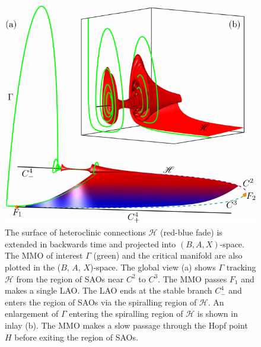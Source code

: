 \documentclass{ws-ijbc}
\begin{document}
\begin{figure}[H]
\centering
\includegraphics[]{./figures/MKMO_13.pdf}
\caption{The surface of heteroclinic connections $\mathscr{H}$ (red-blue fade) is extended in backwards time and projected into $(B,A,X)$-space.  The MMO of interest $\Gamma$ (green) and the critical manifold are also plotted in the ($B$, $A$, $X$)-space.  The global view (a) shows $\Gamma$ tracking $\mathscr{H}$ from the region of SAOs near $C^2$ to $C^3$.  The MMO passes $F_1$ and makes a single LAO.  The LAO ends at the stable branch $C^4_-$ and enters the region of SAOs via the spiralling region of $\mathscr{H}$.  An enlargement of $\Gamma$ entering the spiralling region of $\mathscr{H}$ is shown in inlay (b).  The MMO makes a slow passage through the Hopf point $H$ before exiting the region of SAOs.}
\label{heteroclinic}
\end{figure}
\end{document}
